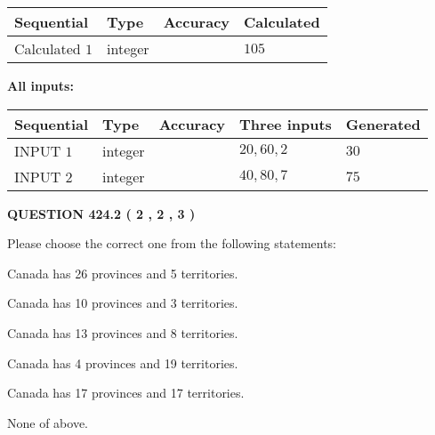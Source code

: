 \documentclass[12pt]{article}
\begin{document}
   
   
   
\noindent{}
   
   
  
  
\noindent\begin{tabular}{|l|l|l|l|}
\hline
 Sequential & Type & Accuracy & Calculated \\ 
\hline
 
 
  Calculated $  1 $ & integer &  & 
  $ 105 $ 
 \\  \hline  
 \end{tabular}
   
   
   
   
\noindent\vspace{0.1in}\hspace{-0.08in} {\textbf{\Large{All inputs: }}}
   
   
  
  
\noindent\begin{tabular}{|l|l|l|l|l|}
\hline
 Sequential & Type & Accuracy & Three inputs & Generated \\ 
\hline
 
 
  INPUT $  1 $ & integer &  & $
 20
 , 
 60
 , 
 2
 $ & $ 30 $ 
 \\  \hline  
 
 
  INPUT $  2 $ & integer &  & $
 40
 , 
 80
 , 
 7
 $ & $ 75 $ 
 \\  \hline  
 \end{tabular}
   
   
  
\vspace{0.2in}
  
{\textbf{\Large{QUESTION
424.2 
 ( 2 , 2 , 3 )
}}}
  
  
Please choose the correct one from the following statements:
 
 
Canada has  26 provinces and  5 territories.
 
 
Canada has 10  provinces and 3 territories.
 
 
Canada has  13 provinces and  8 territories.
 
 
Canada has   4 provinces and  19 territories.
 
 
Canada has  17 provinces and  17 territories.
 
 
 None of above.
 
\end{document}
